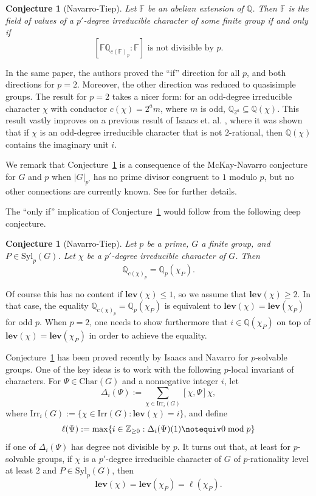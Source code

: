 \documentclass[12pt]{amsart}
\newtheorem{conjecture}[theorem]{Conjecture}
\theoremstyle{definition}
\numberwithin{equation}{section}
\newcommand{\Irr}{{\mathrm {Irr}}}
\newcommand{\Syl}{{\mathrm {Syl}}}
\newcommand{\Char}{{\mathrm {Char}}}
\newcommand{\QQ}{{\mathbb Q}}
\newcommand{\ZZ}{{\mathbb Z}}
\newcommand{\FF}{{\mathbb F}}
\newcommand{\lev}{\mathrm{\mathbf{lev}}}
\begin{document}
\begin{conjecture}[Navarro-Tiep]\label{conj:NT21}
Let $\FF$ be an abelian extension of $\QQ$. Then $\FF$ is the field
of values of a $p'$-degree irreducible character of some finite
group if and only if
\[ [\FF\QQ_{c(\FF)_p} : \FF] \text{ is not divisible by } p.\]
\end{conjecture}

In the same paper, the authors proved the ``if'' direction for all
$p$, and both directions for $p=2$. Moreover, the other direction
was reduced to quasisimple groups. The result for $p=2$ takes a
nicer form: for an odd-degree irreducible character $\chi$ with
conductor $c(\chi)=2^am$, where $m$ is odd, $\QQ_{2^a}\subseteq
\QQ(\chi)$. This result vastly improves on a previous result of
Isaacs et. al. \cite{ILNT}, where it was shown that if $\chi$ is an
odd-degree irreducible character that is not $2$-rational, then
$\QQ(\chi)$ contains the imaginary unit $i$.

We remark that Conjecture~\ref{conj:NT21} is a consequence of the
McKay-Navarro conjecture for $G$ and $p$ when $|G|_{p'}$ has no
prime divisor congruent to $1$ modulo $p$, but no other connections
are currently known. See \cite[Theorem~1.2]{G-Y23} for further
details.



The ``only if'' implication of Conjecture~\ref{conj:NT21} would
follow from the following deep conjecture.


\begin{conjecture}[Navarro-Tiep]\label{conj:NT21-more}
Let $p$ be a prime, $G$ a finite group, and $P\in\Syl_p(G)$. Let
$\chi$ be a $p'$-degree irreducible character of $G$. Then
\[\QQ_{c(\chi)_p}=\QQ_p(\chi_P).\]
\end{conjecture}

Of course this has no content if $\lev(\chi)\leq 1$, so we assume
that $\lev(\chi)\geq 2$. In that case, the equality
$\QQ_{c(\chi)_p}=\QQ_p(\chi_P)$ is equivalent to
$\lev(\chi)=\lev(\chi_P)$ for odd $p$. When $p=2$, one needs to show
furthermore that $i\in\QQ(\chi_P)$ on top of
$\lev(\chi)=\lev(\chi_P)$ in order to achieve the equality.

Conjecture~\ref{conj:NT21-more} has been proved recently by Isaacs
and Navarro \cite{Isaacs-Navarro24} for $p$-solvable groups. One of
the key ideas is to work with the following $p$-local invariant of
characters. For $\Psi\in\Char(G)$ and a nonnegative integer $i$, let
\[
\Delta_i(\Psi):=\sum_{\chi\in\Irr_i(G)} [\chi,\Psi] \chi,
\]
where $\Irr_i(G):=\{\chi\in\Irr(G): \lev(\chi)=i\}$, and define
\[
\ell(\Psi):=\max\{i\in\ZZ_{\geq 0}: \Delta_i(\Psi)(1) \notequiv 0
\bmod p\}
\]
if one of $\Delta_i(\Psi)$ has degree not divisible by $p$. It turns
out that, at least for $p$-solvable groups, if $\chi$ is a
$p'$-degree irreducible character of $G$ of $p$-rationality level at
least 2 and $P\in\Syl_p(G)$, then
\[
\lev(\chi)=\lev(\chi_P)=\ell(\chi_P).
\]
\end{document}
